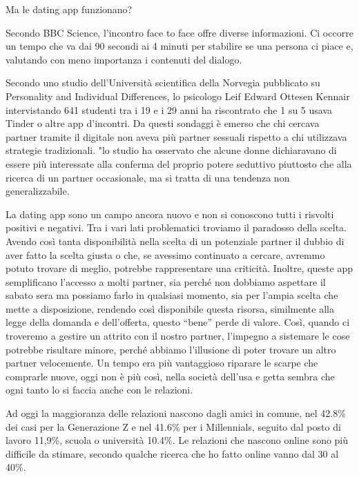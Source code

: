\documentclass[12pt]{book} %
\begin{document}
\begin{mdframed}[linewidth=1pt]
Ma le dating app funzionano?

Secondo BBC Science, l'incontro face to face offre
diverse informazioni. Ci occorre un tempo che va dai 90 secondi ai 4 minuti per stabilire se una persona ci piace e,
valutando con meno importanza i contenuti del dialogo.

Secondo uno studio dell'Università scientifica della Norvegia pubblicato su Personality and Individual Differences, lo
psicologo Leif Edward Ottesen Kennair intervistando 641 studenti tra i 19 e i 29 anni ha riscontrato che 1 su 5 usava
Tinder o altre app d'incontri. Da questi sondaggi è emerso che chi cercava partner tramite il digitale non aveva più
partner sessuali rispetto a chi utilizzava strategie tradizionali. "lo studio ha osservato che alcune donne dichiaravano di essere più interessate alla conferma del proprio potere seduttivo piuttosto che alla ricerca di un partner occasionale, ma si tratta di una tendenza non generalizzabile.

La dating app sono un campo ancora nuovo e non si conoscono tutti i risvolti positivi e negativi. Tra i vari lati
problematici troviamo il paradosso della scelta. Avendo così tanta disponibilità nella scelta di un potenziale partner
il dubbio di aver fatto la scelta giusta o che, se avessimo continuato a cercare, avremmo potuto trovare di meglio,
potrebbe rappresentare una criticità. Inoltre, queste app semplificano l'accesso a molti partner,
sia perché non dobbiamo aspettare il sabato sera ma possiamo farlo in qualsiasi momento, sia per
l'ampia scelta che mette a disposizione, rendendo così disponibile questa risorsa, similmente alla
legge della domanda e dell'offerta, questo “bene” perde di valore. Così, quando ci troveremo a
gestire un attrito con il nostro partner, l'impegno a sistemare le cose potrebbe risultare minore,
perché abbiamo l'illusione di poter trovare un altro partner velocemente. Un tempo era più
vantaggioso riparare le scarpe che comprarle nuove, oggi non è più così, nella società dell'usa e
getta sembra che ogni tanto lo si faccia anche con le relazioni.

Ad oggi la maggioranza delle relazioni nascono dagli amici in comune, nel 42.8\% dei casi per la Generazione Z e nel
41.6\% per i Millennials, seguito dal posto di lavoro 11,9\%, scuola o università 10.4\%. Le relazioni che nascono
online sono più difficile da stimare, secondo qualche ricerca che ho fatto online vanno dal 30 al
40\%.
\end{mdframed}
\end{document}
